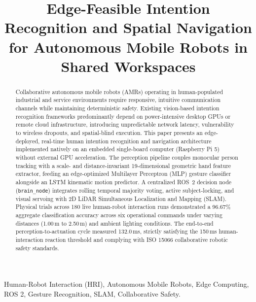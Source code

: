 \documentclass[conference]{IEEEtran}
\begin{document}
\title{Edge-Feasible Intention Recognition and Spatial Navigation for Autonomous Mobile Robots in Shared Workspaces}

\author{
}

\maketitle

\begin{abstract}
Collaborative autonomous mobile robots (AMRs) operating in human-populated industrial and service environments require responsive, intuitive communication channels while maintaining deterministic safety. Existing vision-based intention recognition frameworks predominantly depend on power-intensive desktop GPUs or remote cloud infrastructure, introducing unpredictable network latency, vulnerability to wireless dropouts, and spatial-blind execution. This paper presents an edge-deployed, real-time human intention recognition and navigation architecture implemented natively on an embedded single-board computer (Raspberry Pi 5) without external GPU acceleration. The perception pipeline couples monocular person tracking with a scale- and distance-invariant 19-dimensional geometric hand feature extractor, feeding an edge-optimized Multilayer Perceptron (MLP) gesture classifier alongside an LSTM kinematic motion predictor. A centralized ROS~2 decision node (\texttt{brain\_node}) integrates rolling temporal majority voting, active subject-locking, and visual servoing with 2D LiDAR Simultaneous Localization and Mapping (SLAM). Physical trials across 180 live human-robot interaction runs demonstrated a 96.67\% aggregate classification accuracy across six operational commands under varying distances (1.00\,m to 2.50\,m) and ambient lighting conditions. The end-to-end perception-to-actuation cycle measured 132.0\,ms, strictly satisfying the 150\,ms human-interaction reaction threshold and complying with ISO 15066 collaborative robotic safety standards.
\end{abstract}

\begin{IEEEkeywords}
Human-Robot Interaction (HRI), Autonomous Mobile Robots, Edge Computing, ROS 2, Gesture Recognition, SLAM, Collaborative Safety.
\end{IEEEkeywords}
\end{document}
